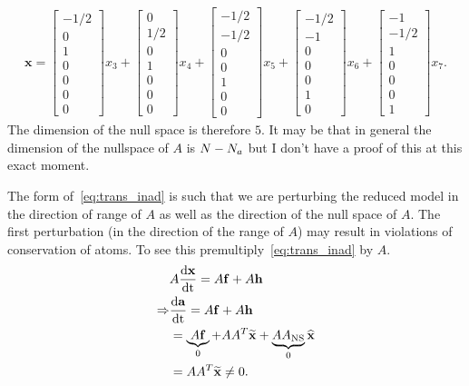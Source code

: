 \begin{align}
  \mathbf{x} = 
  \begin{bmatrix} -1/2 \\ 0 \\ 1 \\ 0 \\ 0 \\ 0 \\ 0 \end{bmatrix}x_{3} 
  + 
  \begin{bmatrix} 0 \\ 1/2 \\ 0 \\ 1 \\ 0 \\ 0 \\ 0 \end{bmatrix}x_{4} 
  + 
  \begin{bmatrix} -1/2 \\ \displaystyle -1/2 \\ 0 \\ 0 \\ 1 \\ 0 \\ 0 \end{bmatrix}x_{5} 
  + 
  \begin{bmatrix} -1/2 \\ -1 \\ 0 \\ 0 \\ 0 \\ 1 \\ 0 \end{bmatrix}x_{6} 
  + 
  \begin{bmatrix} -1 \\ -1/2 \\ 1 \\ 0 \\ 0 \\ 0 \\ 1 \end{bmatrix}x_{7}.
\end{align}
The dimension of the null space is therefore $5$.  It may be that in general 
the dimension of the nullspace of $A$ is $N - N_{a}$ but I don't have a 
proof of this at this exact moment.

The form of~\eqref{eq:trans_inad} is such that we are perturbing the 
reduced model in the direction of range of $A$ as well as the direction 
of the null space of $A$.  The first perturbation (in the direction 
of the range of $A$) may result in violations of conservation of atoms.
To see this premultiply~\eqref{eq:trans_inad} by $A$.
\begin{align}
  &A\frac{\mathrm{d} \mathbf{x}}{\mathrm{d} \mathrm{t}} = A\mathbf{f} + A\mathbf{h} \\
  \Rightarrow &\frac{\mathrm{d} \mathbf{a}}{\mathrm{d} \mathrm{t}} = A\mathbf{f} + A\mathbf{h} \\
              &= \underbrace{A\mathbf{f}}_{0} + 
                 AA^{T}\widetilde{\mathbf{x}} + 
                 \underbrace{AA_{\textrm{NS}}}_{0}\widehat{\mathbf{x}} \\
              &= AA^{T}\widetilde{\mathbf{x}} \neq 0.
\end{align}

